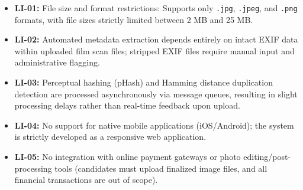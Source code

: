 \begin{itemize}[leftmargin=*, itemsep=0.3em]
    \item \textbf{LI-01:} File size and format restrictions: Supports only \texttt{.jpg}, \texttt{.jpeg}, and \texttt{.png} formats, with file sizes strictly limited between 2 MB and 25 MB.
    \item \textbf{LI-02:} Automated metadata extraction depends entirely on intact EXIF data within uploaded film scan files; stripped EXIF files require manual input and administrative flagging.
    \item \textbf{LI-03:} Perceptual hashing (pHash) and Hamming distance duplication detection are processed asynchronously via message queues, resulting in slight processing delays rather than real-time feedback upon upload.
    \item \textbf{LI-04:} No support for native mobile applications (iOS/Android); the system is strictly developed as a responsive web application.
    \item \textbf{LI-05:} No integration with online payment gateways or photo editing/post-processing tools (candidates must upload finalized image files, and all financial transactions are out of scope).
\end{itemize}
\renewcommand{\thesubsection}{\thesection.\arabic{subsection}}

